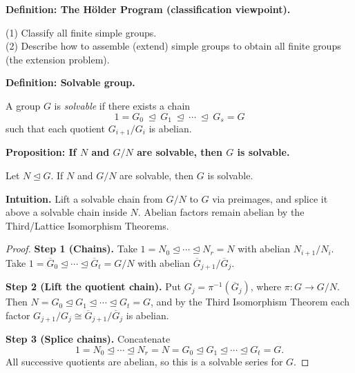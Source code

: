 \documentclass[9pt]{article}
\theoremstyle{definition}
\begin{document}
\newpage


\noindent\textbf{Definition: The Hölder Program (classification viewpoint).}

\newpage

(1) Classify all finite simple groups.\\
(2) Describe how to assemble (extend) simple groups to obtain all finite groups (the extension problem).

\newpage


\noindent\textbf{Definition: Solvable group.}

\newpage

A group $G$ is \emph{solvable} if there exists a chain 
\[
1=G_0\ \trianglelefteq\ G_1\ \trianglelefteq\ \cdots\ \trianglelefteq\ G_s=G
\]
such that each quotient $G_{i+1}/G_i$ is abelian.

\newpage


\noindent\textbf{Proposition: If $N$ and $G/N$ are solvable, then $G$ is solvable.}

\newpage

Let $N\trianglelefteq G$. If $N$ and $G/N$ are solvable, then $G$ is solvable.

\dotfill

\noindent\textbf{Intuition.}
Lift a solvable chain from $G/N$ to $G$ via preimages, and splice it above a solvable chain inside $N$. Abelian factors remain abelian by the Third/Lattice Isomorphism Theorems.

\dotfill

\begin{proof}
\textbf{Step 1 (Chains).} Take $1=N_0\trianglelefteq\cdots\trianglelefteq N_r=N$ with abelian $N_{i+1}/N_i$. Take $1=\overline{G}_0\trianglelefteq\cdots\trianglelefteq\overline{G}_t=G/N$ with abelian $\overline{G}_{j+1}/\overline{G}_j$.

\textbf{Step 2 (Lift the quotient chain).} Put $G_j=\pi^{-1}(\overline{G}_j)$, where $\pi:G\to G/N$. Then $N=G_0\trianglelefteq G_1\trianglelefteq\cdots\trianglelefteq G_t=G$, and by the Third Isomorphism Theorem each factor $G_{j+1}/G_j\cong \overline{G}_{j+1}/\overline{G}_j$ is abelian.

\textbf{Step 3 (Splice chains).} Concatenate
\[
1=N_0\trianglelefteq\cdots\trianglelefteq N_r=N=G_0\trianglelefteq G_1\trianglelefteq\cdots\trianglelefteq G_t=G.
\]
All successive quotients are abelian, so this is a solvable series for $G$.
\end{proof}
\end{document}
